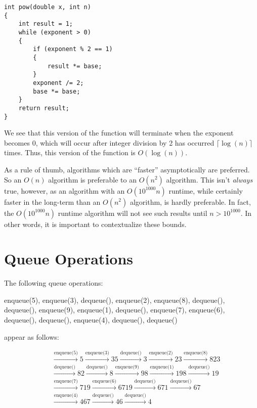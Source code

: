 \documentclass[a4paper]{article}
\begin{document}
\begin{verbatim}
int pow(double x, int n)
{
	int result = 1;
	while (exponent > 0)
	{
		if (exponent % 2 == 1)
		{
			result *= base;
		}
		exponent /= 2;
		base *= base;
	}
	return result;
}
\end{verbatim}

We see that this version of the function will terminate when the exponent becomes 0, which will occur after integer division by 2 has occurred $\lceil\log(n)\rceil$ times. Thus, this version of the function is $O(\log(n))$.

As a rule of thumb, algorithms which are ``faster'' asymptotically are preferred. So an $O(n)$ algorithm is preferable to an $O(n^2)$ algorithm. This isn't \textit{always} true, however, as an algorithm with an $O(10^{1000}n)$ runtime, while certainly faster in the long-term than an $O(n^2)$ algorithm, is hardly preferable. In fact, the $O(10^{1000}n)$ runtime algorithm will not see such results until $n>10^{1000}$. In other words, it is important to contextualize these bounds.


\section{Queue Operations}
The following queue operations:

enqueue(5), enqueue(3), dequeue(), enqueue(2), enqueue(8), dequeue(), dequeue(), enqueue(9), enqueue(1), dequeue(), enqueue(7), enqueue(6), dequeue(), dequeue(), enqueue(4), dequeue(), dequeue()

appear as follows:

\begin{align*}
\boxed{\phantom{5}}&\xrightarrow{\text{enqueue(5)}}\boxed{5}\xrightarrow{\text{enqueue(3)}}\boxed{3}\boxed{5}\xrightarrow{\text{dequeue()}}\boxed{3}\xrightarrow{\text{enqueue(2)}}\boxed{2}\boxed{3}\xrightarrow{\text{enqueue(8)}}\boxed{8}\boxed{2}\boxed{3}\\&\xrightarrow{\text{dequeue()}}\boxed{8}\boxed{2}\xrightarrow{\text{dequeue()}}\boxed{8}\xrightarrow{\text{enqueue(9)}}\boxed{9}\boxed{8}\xrightarrow{\text{enqueue(1)}}\boxed{1}\boxed{9}\boxed{8}\xrightarrow{\text{dequeue()}}\boxed{1}\boxed{9}\\&\xrightarrow{\text{enqueue(7)}}\boxed{7}\boxed{1}\boxed{9}\xrightarrow{\text{enqueue(6)}}\boxed{6}\boxed{7}\boxed{1}\boxed{9}\xrightarrow{\text{dequeue()}}\boxed{6}\boxed{7}\boxed{1}\xrightarrow{\text{dequeue()}}\boxed{6}\boxed{7}\\&\xrightarrow{\text{enqueue(4)}}\boxed{4}\boxed{6}\boxed{7}\xrightarrow{\text{dequeue()}}\boxed{4}\boxed{6}\xrightarrow{\text{dequeue()}}\boxed{4}
\end{align*}
\end{document}
